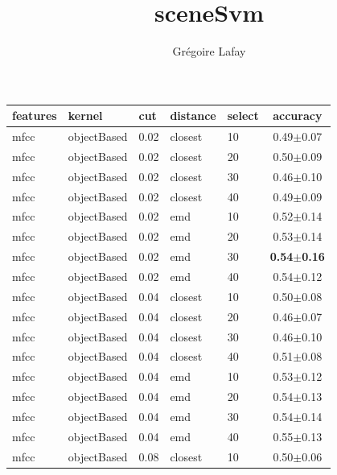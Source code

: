 \documentclass[12pt,a4paper,fleqn]{tufte-handout}
\title{sceneSvm}
\author{ Grégoire Lafay }
\begin{document}
     
 
\maketitle     
 
 
 
 
 
 
 
\begin{table}   
\begin{center}   
\scriptsize   
\setlength{\tabcolsep}{.16667em}   
\begin{tabular}{lllllc}   
features & kernel & cut & distance & select & accuracy \\   
\hline   
mfcc & objectBased & 0.02 & closest & 10 & 0.49$\pm$0.07 \\   
mfcc & objectBased & 0.02 & closest & 20 & 0.50$\pm$0.09 \\   
mfcc & objectBased & 0.02 & closest & 30 & 0.46$\pm$0.10 \\   
mfcc & objectBased & 0.02 & closest & 40 & 0.49$\pm$0.09 \\   
mfcc & objectBased & 0.02 & emd & 10 & 0.52$\pm$0.14 \\   
mfcc & objectBased & 0.02 & emd & 20 & 0.53$\pm$0.14 \\   
mfcc & objectBased & 0.02 & emd & 30 & \textbf{0.54$\pm$0.16} \\   
mfcc & objectBased & 0.02 & emd & 40 & 0.54$\pm$0.12 \\   
mfcc & objectBased & 0.04 & closest & 10 & 0.50$\pm$0.08 \\   
mfcc & objectBased & 0.04 & closest & 20 & 0.46$\pm$0.07 \\   
mfcc & objectBased & 0.04 & closest & 30 & 0.46$\pm$0.10 \\   
mfcc & objectBased & 0.04 & closest & 40 & 0.51$\pm$0.08 \\   
mfcc & objectBased & 0.04 & emd & 10 & 0.53$\pm$0.12 \\   
mfcc & objectBased & 0.04 & emd & 20 & 0.54$\pm$0.13 \\   
mfcc & objectBased & 0.04 & emd & 30 & 0.54$\pm$0.14 \\   
mfcc & objectBased & 0.04 & emd & 40 & 0.55$\pm$0.13 \\   
mfcc & objectBased & 0.08 & closest & 10 & 0.50$\pm$0.06 \\   

\end{tabular}
\end{center}
\end{table}
\end{document}
